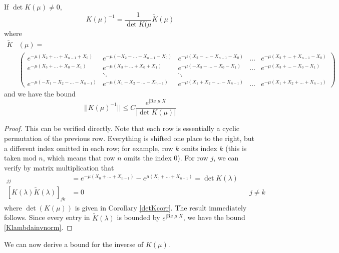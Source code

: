 \documentclass[thesis.tex]{subfiles}
\begin{document}
\begin{lemma}\label{Kinvlemma}
If $\det K(\mu) \neq 0$,
\begin{equation}\label{Klambdainv}
K(\mu)^{-1} = \frac{1}{\det K(\mu} \tilde{K}(\mu)
\end{equation}
where
\begin{align}\label{tildeK}
\tilde{K}&(\mu) = \\
&\begin{pmatrix}
e^{-\mu(X_2+\dots+X_{n-1}+X_0)} & e^{-\mu(-X_2-\dots-X_{n-1}-X_0)} &
e^{-\mu(X_2-\dots-X_{n-1}-X_0)} & \dots & e^{-\mu(X_2+\dots+X_{n-1}-X_0)}  \\ 
e^{-\mu(X_3+\dots+X_0-X_1)} & e^{-\mu(X_3+\dots+X_0+X_1)} &
e^{-\mu(-X_3-\dots-X_0-X_1)} & \dots & e^{-\mu(X_3+\dots-X_0-X_1)} \\ 
& \ddots & \ddots \\
e^{-\mu(-X_1-X_2 -\dots-X_{n-1})} & e^{-\mu(X_1-X_2 -\dots-X_{n-1})} &
e^{-\mu(X_1+X_2 -\dots-X_{n-1})} & \dots & e^{-\mu(X_1+X_2+\dots+X_{n-1})}  \nonumber 
\end{pmatrix}
\end{align}
and we have the bound
\begin{equation}\label{Klambdainvnorm}
||K(\mu)^{-1}|| \leq C \frac{e^{|\text{Re }\mu|X }}{| \det K(\mu) |}
\end{equation}
\begin{proof}
This can be verified directly. Note that each row is essentially a cyclic permutation of the previous row. Everything is shifted one place to the right, but a different index omitted in each row; for example, row $k$ omits index $k$ (this is taken $\text{mod } n$, which means that row $n$ omits the index 0). For row $j$, we can verify by matrix multiplication that
\begin{align*}
[K(\lambda)\tilde{K}(\lambda)]_{jj} &= e^{-\mu(X_0 + \dots + X_{n-1})} - e^{\mu(X_0 + \dots + X_{n-1})} = \det K(\lambda) \\
[K(\lambda)\tilde{K}(\lambda)]_{jk} &= 0 && j \neq k
\end{align*}
where $\det(K(\mu))$ is given in Corollary \ref{detKcorr}. The result immediately follows. Since every entry in $\tilde{K}(\lambda)$ is bounded by $e^{|\text{Re }\mu|X }$, we have the bound \cref{Klambdainvnorm}.
\end{proof}
\end{lemma}

We can now derive a bound for the inverse of $K(\mu)$.
\end{document}
